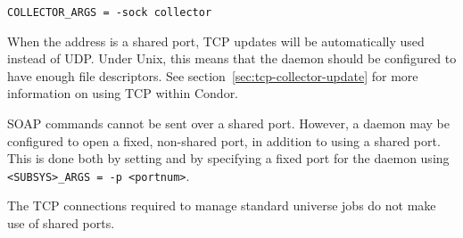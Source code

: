 \begin{verbatim}
COLLECTOR_ARGS = -sock collector
\end{verbatim}

When the  address is a shared port,
TCP updates will be automatically used instead of UDP.
Under Unix, this means that the
 daemon should be configured to have enough file descriptors.
See section~\ref{sec:tcp-collector-update} for more information on using
TCP within Condor.

SOAP commands cannot be sent over a shared port.
However, a daemon may be configured to open a fixed, non-shared port,
in addition to using a shared port.
This is done both by setting
 and by specifying a fixed port for the daemon
using \verb|<SUBSYS>_ARGS = -p <portnum>|.

The TCP connections required to manage standard universe jobs do not
make use of shared ports.

